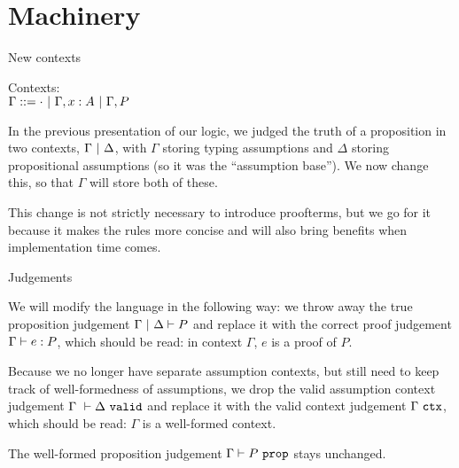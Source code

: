 \documentclass{beamer}
\begin{document}
\section{Machinery}

\begin{frame}{New contexts}

Contexts: \\
$\Gamma ::= \emptytypingctx \pipe \extend{\Gamma}{x}{A} \pipe \assume{\Gamma}{P}$

\vspace{2em}

In the previous presentation of our logic, we judged the truth of a proposition in two contexts, $\Gamma \ |\  \Delta$, with $\Gamma$ storing typing assumptions and $\Delta$ storing propositional assumptions (so it was the ``assumption base''). We now change this, so that $\Gamma$ will store both of these.

\vspace{2em}

This change is not strictly necessary to introduce proofterms, but we go for it because it makes the rules more concise and will also bring benefits when implementation time comes.

\end{frame}

\begin{frame}{Judgements}

We will modify the language in the following way: we throw away the true proposition judgement $\holds{P}$ and replace it with the correct proof judgement $\proves{e}{P}$, which should be read: in context $\Gamma$, $e$ is a proof of $P$.

\vspace{2em}

Because we no longer have separate assumption contexts, but still need to keep track of well-formedness of assumptions, we drop the valid assumption context judgement $\assctx[\Gamma]{\Delta}$ and replace it with the valid context judgement $\Gamma\ \texttt{ctx}$, which should be read: $\Gamma$ is a well-formed context.

\vspace{2em}

The well-formed proposition judgement $\prop[\Gamma]{P}$ stays unchanged.

\end{frame}
\end{document}
